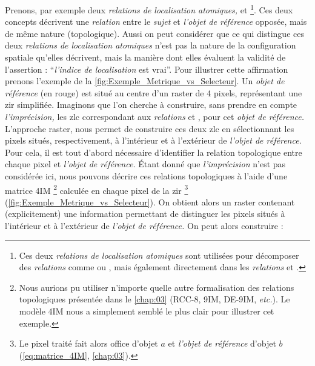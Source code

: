 Prenons, par exemple deux \emph{relations de localisation atomiques,}
 et 
\footnote{Ces deux \emph{relations de localisation atomiques} sont
  utilisées pour décomposer des \emph{relations} comme
  \protect{} ou
  \protect{}, mais également
  directement dans les \emph{relations}
  \protect{} et
  \protect{}.}. Ces deux concepts
décrivent une \emph{relation} entre le \emph{sujet} et \emph{l'objet
  de référence} opposée, mais de même nature (\ie topologique). Aussi
on peut considérer que ce qui distingue ces deux \emph{relations de
  localisation atomiques} n'est pas la nature de la configuration
spatiale qu'elles décrivent, mais la manière dont elles évaluent la
validité de l'assertion : \enquote{\emph{l'indice de localisation} est
  vrai}. Pour illustrer cette affirmation prenons l'exemple de la
\autoref{fig:Exemple_Metrique_vs_Selecteur}. Un \emph{objet de
  référence} (en rouge) est situé au centre d'un raster de 4 pixels,
représentant une \ac{zir} simplifiée. Imaginons que l'on cherche à
construire, sans prendre en compte \emph{l'imprécision,} les \ac{zlc}
correspondant aux \emph{relations}  et
, pour cet \emph{objet de référence.} L'approche
raster, nous permet de construire ces deux \ac{zlc} en sélectionnant
les pixels situés, respectivement, à l'intérieur et à l'extérieur de
\emph{l'objet de référence.} Pour cela, il est tout d'abord nécessaire
d'identifier la relation topologique entre chaque pixel et
\emph{l'objet de référence.} Étant donné que \emph{l'imprécision}
n'est pas considérée ici, nous pouvons décrire ces relations
topologiques à l'aide d'une matrice 4IM \footnote{Nous aurions pu
  utiliser n'importe quelle autre formalisation des relations
  topologiques présentée dans le \autoref{chap:03} (RCC-8, 9IM,
  DE-9IM, \emph{etc.}). Le modèle 4IM nous a simplement semblé le plus
  clair pour illustrer cet exemple.}  calculée en chaque pixel de la
\ac{zir} \footnote{Le pixel traité fait alors office d'objet \(a\) et
  \emph{l'objet de référence} d'objet \(b\) (\autoref{eq:matrice_4IM},
  \autoref{chap:03}).}
(\autoref{fig:Exemple_Metrique_vs_Selecteur}). On obtient alors un
raster contenant (explicitement) une information permettant de
distinguer les pixels situés à l'intérieur et à l'extérieur de
\emph{l'objet de référence.} On peut alors construire :
% 
